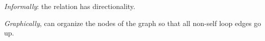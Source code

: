 
{\it Informally}: the relation has directionality.

{\it Graphically}, can organize the nodes of the graph so that 
all non-self loop edges go up.